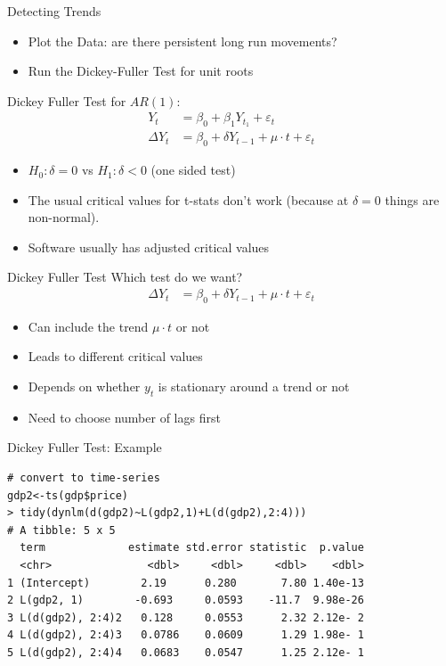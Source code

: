 \begin{frame}{Detecting Trends}
\begin{itemize}
\item Plot the Data: are there persistent long run movements?
\item Run the Dickey-Fuller Test for unit roots
\end{itemize}
Dickey Fuller Test for $AR(1)$:
\begin{align*}
Y_t &= \beta_0 + \beta_1 Y_{t_1} +\varepsilon_t\\
\Delta Y_t &= \beta_0 + \delta Y_{t-1} + \mu \cdot t + \varepsilon_t
\end{align*}
\begin{itemize}
\item $H_0: \delta = 0$ vs $H_1: \delta < 0$ (one sided test)
\item The usual critical values for t-stats don't work (because at $\delta=0$ things are non-normal).
\item Software usually has adjusted critical values
\end{itemize}
\end{frame}


\begin{frame}{Dickey Fuller Test}
Which test do we want?
\begin{align*}
\Delta Y_t &= \beta_0 + \delta Y_{t-1} + \mu \cdot t + \varepsilon_t
\end{align*}
\begin{itemize}
\item Can include the trend $\mu \cdot t$ or not
\item Leads to different critical values
\item Depends on whether $y_t$ is stationary around a trend or not
\item Need to choose number of lags first
\end{itemize}
\end{frame}


\begin{frame}[fragile]{Dickey Fuller Test: Example}
\small
\begin{verbatim}
# convert to time-series
gdp2<-ts(gdp$price)
> tidy(dynlm(d(gdp2)~L(gdp2,1)+L(d(gdp2),2:4)))
# A tibble: 5 x 5
  term             estimate std.error statistic  p.value
  <chr>               <dbl>     <dbl>     <dbl>    <dbl>
1 (Intercept)        2.19      0.280       7.80 1.40e-13
2 L(gdp2, 1)        -0.693     0.0593    -11.7  9.98e-26
3 L(d(gdp2), 2:4)2   0.128     0.0553      2.32 2.12e- 2
4 L(d(gdp2), 2:4)3   0.0786    0.0609      1.29 1.98e- 1
5 L(d(gdp2), 2:4)4   0.0683    0.0547      1.25 2.12e- 1
\end{verbatim}
\end{frame}


